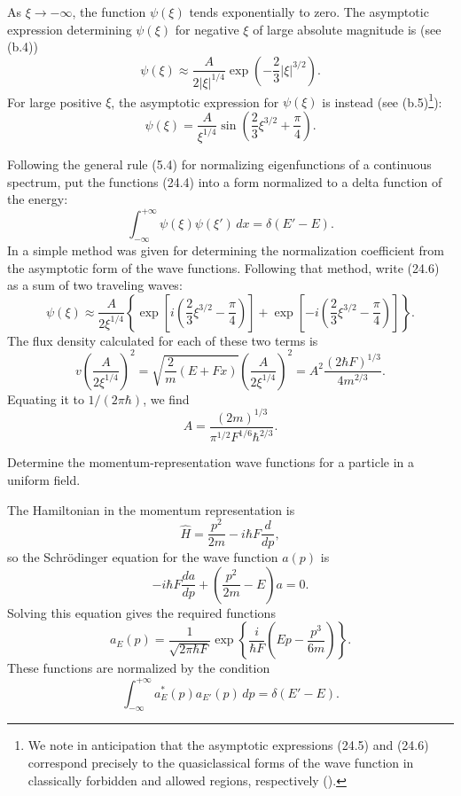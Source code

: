 As $\xi\to-\infty$, the function $\psi(\xi)$ tends exponentially to zero.
The asymptotic expression determining $\psi(\xi)$ for negative $\xi$ of large
absolute magnitude is (see (b.4))
\begin{equation}
  \psi(\xi)\approx\frac{A}{2|\xi|^{1/4}}
  \exp\left(-\frac{2}{3}|\xi|^{3/2}\right).
  \tag{24.5}
\end{equation}
For large positive $\xi$, the asymptotic expression for $\psi(\xi)$ is instead
(see (b.5)\footnote{We note in anticipation that the asymptotic expressions
(24.5) and (24.6) correspond precisely to the quasiclassical forms of the wave
function in classically forbidden and allowed regions, respectively
().}):
\begin{equation}
  \psi(\xi)=\frac{A}{\xi^{1/4}}
  \sin\left(\frac{2}{3}\xi^{3/2}+\frac{\pi}{4}\right).
  \tag{24.6}
\end{equation}

Following the general rule (5.4) for normalizing eigenfunctions of a
continuous spectrum, put the functions (24.4) into a form normalized to a
delta function of the energy:
\begin{equation}
  \int_{-\infty}^{+\infty}\psi(\xi)\psi(\xi')\,dx=\delta(E'-E).
  \tag{24.7}
\end{equation}
In  a simple method was given for determining the normalization
coefficient from the asymptotic form of the wave functions. Following that
method, write (24.6) as a sum of two traveling waves:
\[
  \psi(\xi)\approx\frac{A}{2\xi^{1/4}}
  \left\{
  \exp\left[i\left(\frac{2}{3}\xi^{3/2}-\frac{\pi}{4}\right)\right]
  +\exp\left[-i\left(\frac{2}{3}\xi^{3/2}-\frac{\pi}{4}\right)\right]
  \right\}.
\]
The flux density calculated for each of these two terms is
\[
  v\left(\frac{A}{2\xi^{1/4}}\right)^2
  =\sqrt{\frac{2}{m}(E+Fx)}
  \left(\frac{A}{2\xi^{1/4}}\right)^2
  =A^2\frac{(2\hbar F)^{1/3}}{4m^{2/3}}.
\]
Equating it to $1/(2\pi\hbar)$, we find
\begin{equation}
  A=\frac{(2m)^{1/3}}{\pi^{1/2}F^{1/6}\hbar^{2/3}}.
  \tag{24.8}
\end{equation}

\ProblemHeading
Determine the momentum-representation wave functions for a particle in a
uniform field.

\SolutionHeading
The Hamiltonian in the momentum representation is
\[
  \widehat H=\frac{p^2}{2m}-i\hbar F\frac{d}{dp},
\]
so the Schrödinger equation for the wave function $a(p)$ is
\[
  -i\hbar F\frac{da}{dp}+\left(\frac{p^2}{2m}-E\right)a=0.
\]
Solving this equation gives the required functions
\[
  a_E(p)=\frac{1}{\sqrt{2\pi\hbar F}}
  \exp\left\{\frac{i}{\hbar F}
  \left(Ep-\frac{p^3}{6m}\right)\right\}.
\]
These functions are normalized by the condition
\[
  \int_{-\infty}^{+\infty}a_E^*(p)a_{E'}(p)\,dp=\delta(E'-E).
\]
